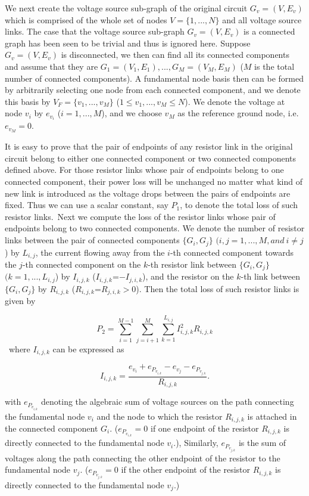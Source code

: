 We next create the voltage source sub-graph of the original circuit $G_v=(V,E_v)$ which is comprised of the whole set of nodes $V=\{1,...,N\}$ and all voltage source links. The case that the voltage source sub-graph $G_v=(V,E_v)$ is a connected graph has been seen to be trivial and thus is ignored here. Suppose $G_v=(V,E_v)$ is disconnected, we then can find all its connected components and assume that they are $G_1=(V_1,E_1),...,G_M=(V_M,E_M)$ ($M$ is the total number of connected components). A fundamental node basis then can be formed by arbitrarily selecting one node from each connected component, and we denote this basis by $V_F=\{v_1,...,v_M\}$ ($1 \leq v_1,...,v_M \leq N$). We denote the voltage at node $v_i$ by $e_{v_i}$ ($i=1,...,M$), and we choose $v_M$ as the reference ground node, i.e. $e_{v_M}=0$.

It is easy to prove that the pair of endpoints of any resistor link in the original circuit belong to either one connected component or two connected components defined above. For those resistor links whose pair of endpoints belong to one connected component, their power loss will be unchanged no matter what kind of new link is introduced as the voltage drops between the pairs of endpoints are fixed. Thus we can use a scalar constant, say $P_1$, to denote the total loss of such resistor links.\ Next we compute the loss of the resistor links whose pair of endpoints belong to two connected components. We denote the number of resistor links between the pair of connected components $\{G_i,G_j\}$ $(i,j=1,...,M, and \ i\neq j$) by $L_{i,j}$, the current flowing away from the $i$-th connected component towards the $j$-th connected component on the $k$-th resistor link between $\{G_i,G_j\}$ $(k=1,...,L_{i,j}$) by $I_{i,j,k}$ ($I_{i,j,k}$=$-I_{j,i,k}$), and the resistor on the $k$-th link between $\{G_i,G_j\}$ by $R_{i,j,k}$ ($R_{i,j,k}$=$R_{j,i,k}>0$). Then the total loss of such resistor links is given by

$$P_2 =  \sum_{i=1}^{M-1}\sum_{j=i+1}^{M}\sum_{k=1}^{L_{i,j}}I_{i,j,k}^2R_{i,j,k}$$\ where $I_{i,j,k}$ can be expressed as

$$I_{i,j,k}=\frac{e_{v_i}+e_{P_{v_{i,k}}}-e_{v_j}-e_{P_{v_{j,k}}}}{R_{i,j,k}}.$$

with $e_{P_{v_{i,k}}}$ denoting the algebraic sum of voltage sources on the path connecting the fundamental node $v_i$ and the node to which the resistor $R_{i,j,k}$ is attached in the connected component $G_i$.
 ($e_{P_{v_{i,k}}}=0$ if one endpoint of the resistor $R_{i,j,k}$ is directly connected to the fundamental node $v_i$.), Similarly, $e_{P_{v_{j,k}}}$ is the sum of voltages along the path connecting the other endpoint of the resistor to the fundamental node $v_j$. ($e_{P_{v_{j,k}}}=0$ if the other endpoint of the resistor $R_{i,j,k}$ is directly connected to the fundamental node $v_j$.)

